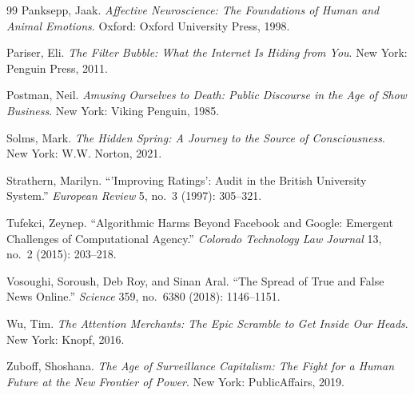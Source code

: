 \documentclass[12pt,a4paper]{book}
\begin{document}
\begin{thebibliography}{99}
 Panksepp, Jaak. \emph{Affective Neuroscience: The Foundations of Human and Animal Emotions}. Oxford: Oxford University Press, 1998.

 Pariser, Eli. \emph{The Filter Bubble: What the Internet Is Hiding from You}. New York: Penguin Press, 2011.

 Postman, Neil. \emph{Amusing Ourselves to Death: Public Discourse in the Age of Show Business}. New York: Viking Penguin, 1985.

 Solms, Mark. \emph{The Hidden Spring: A Journey to the Source of Consciousness}. New York: W.W. Norton, 2021.

 Strathern, Marilyn. ``'Improving Ratings': Audit in the British University System.'' \emph{European Review} 5, no.\ 3 (1997): 305--321.

 Tufekci, Zeynep. ``Algorithmic Harms Beyond Facebook and Google: Emergent Challenges of Computational Agency.'' \emph{Colorado Technology Law Journal} 13, no.\ 2 (2015): 203--218.

 Vosoughi, Soroush, Deb Roy, and Sinan Aral. ``The Spread of True and False News Online.'' \emph{Science} 359, no.\ 6380 (2018): 1146--1151.

 Wu, Tim. \emph{The Attention Merchants: The Epic Scramble to Get Inside Our Heads}. New York: Knopf, 2016.

 Zuboff, Shoshana. \emph{The Age of Surveillance Capitalism: The Fight for a Human Future at the New Frontier of Power}. New York: PublicAffairs, 2019.

\end{thebibliography}
\end{document}
